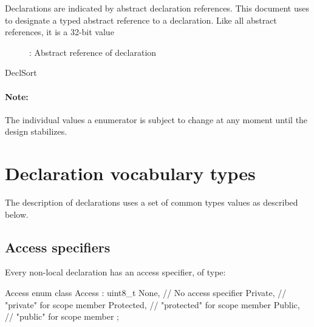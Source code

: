 \label{sec:ifc-decls}

Declarations are indicated by abstract declaration references.  This document
uses  to designate a typed abstract reference to a
declaration.  Like all abstract references, it is a 32-bit value
\begin{figure}[htbp]
  \centering
  \caption{: Abstract reference of declaration}
  \label{fig:ifc-decl-index}
\end{figure}

\begin{SortEnum}{DeclSort}
\end{SortEnum}

\paragraph{Note:}
The individual values a  enumerator is subject to change
at any moment until the design stabilizes.

\section{Declaration vocabulary types}
\label{sec:ifc-decl-support-types}

The description of declarations uses a set of common types values as described below.

\subsection{Access specifiers}
\label{sec:ifc-access-specifier}

Every non-local declaration has an access specifier, of type:
\begin{typedef}{Access}{}
	enum class Access : uint8_t {
		None,				// No access specifier
		Private,				// "private" for scope member
		Protected,			// "protected" for scope member
		Public,				// "public" for scope member
	};
\end{typedef}

